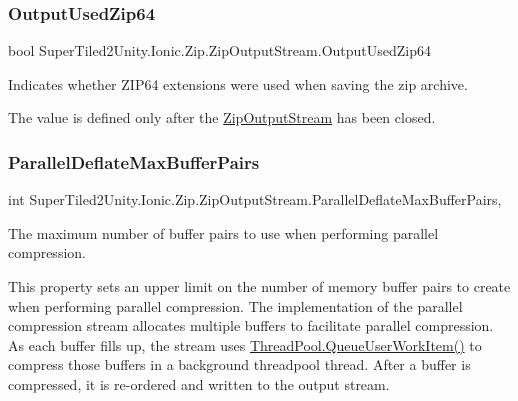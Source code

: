 \subsubsection{\texorpdfstring{Output\+Used\+Zip64}{OutputUsedZip64}}
{\footnotesize\ttfamily bool Super\+Tiled2\+Unity.\+Ionic.\+Zip.\+Zip\+Output\+Stream.\+Output\+Used\+Zip64\hspace{0.3cm}{\ttfamily [get]}}



Indicates whether Z\+I\+P64 extensions were used when saving the zip archive. 

The value is defined only after the {\ttfamily \mbox{\hyperlink{class_super_tiled2_unity_1_1_ionic_1_1_zip_1_1_zip_output_stream}{Zip\+Output\+Stream}}} has been closed. \mbox{\label{class_super_tiled2_unity_1_1_ionic_1_1_zip_1_1_zip_output_stream_ad5f3ac0c07bfd366b2f6f7a1afbc2f18}} 
\subsubsection{\texorpdfstring{Parallel\+Deflate\+Max\+Buffer\+Pairs}{ParallelDeflateMaxBufferPairs}}
{\footnotesize\ttfamily int Super\+Tiled2\+Unity.\+Ionic.\+Zip.\+Zip\+Output\+Stream.\+Parallel\+Deflate\+Max\+Buffer\+Pairs\hspace{0.3cm}{\ttfamily [get]}, {\ttfamily [set]}}



The maximum number of buffer pairs to use when performing parallel compression. 

This property sets an upper limit on the number of memory buffer pairs to create when performing parallel compression. The implementation of the parallel compression stream allocates multiple buffers to facilitate parallel compression. As each buffer fills up, the stream uses \mbox{\hyperlink{}{Thread\+Pool.\+Queue\+User\+Work\+Item()}} to compress those buffers in a background threadpool thread. After a buffer is compressed, it is re-\/ordered and written to the output stream. 

